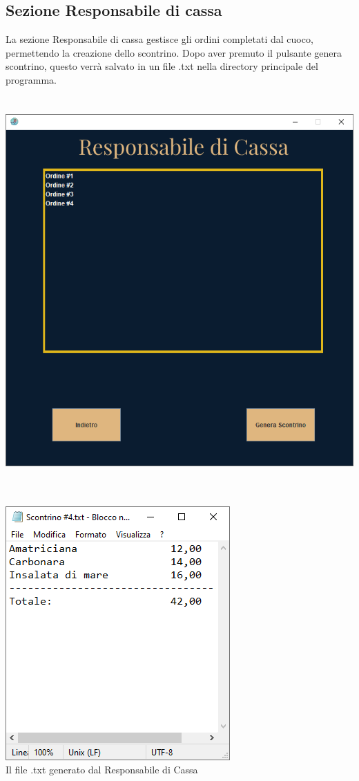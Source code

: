\documentclass{article}
\begin{document}
    \newpage    
    \subsection{Sezione Responsabile di cassa}
    La sezione Responsabile di cassa gestisce gli ordini completati dal cuoco, permettendo la creazione dello scontrino.
    Dopo aver premuto il pulsante genera scontrino, questo verrà salvato in un file .txt nella directory principale del programma.
    \\\\\\
    \includegraphics[width=\textwidth]{ResponsabileDiCassa.png}
    \\\\\\
    \begin{center}
        \includegraphics[scale=0.7]{Scontrino.png} \\
        \caption{Il file .txt generato dal Responsabile di Cassa}
    \end{center}
    
\end{document}
